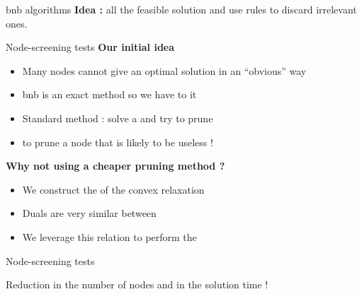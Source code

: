 \begin{frame}{\glsdesc{bnb} algorithms}
  \textbf{Idea :}  all the feasible solution and use  rules to discard irrelevant ones.
  \begin{center}
    
  \end{center}
\end{frame}

\begin{frame}{Node-screening tests}
  \textbf{Our initial idea}
  \begin{itemize}
    \item Many nodes cannot give an optimal solution in an ``obvious'' way
    \pause
    \item \gls{bnb} is an exact method so we have to  it
    \pause
    \item Standard method : solve a  and try to prune
    \pause
    \item {} to prune a node that is likely to be useless !
  \end{itemize}
  \pause
  \textbf{Why not using a cheaper pruning method ?}
  \begin{itemize}
    \item We construct the  of the convex relaxation
    \pause
    \item Duals are very similar between 
    \pause
    \item We leverage this relation to perform the 
  \end{itemize}
\end{frame}

\begin{frame}{Node-screening tests}
  
  \pause
  \begin{center}
    Reduction in the number of nodes and in the solution time !
  \end{center}
\end{frame}